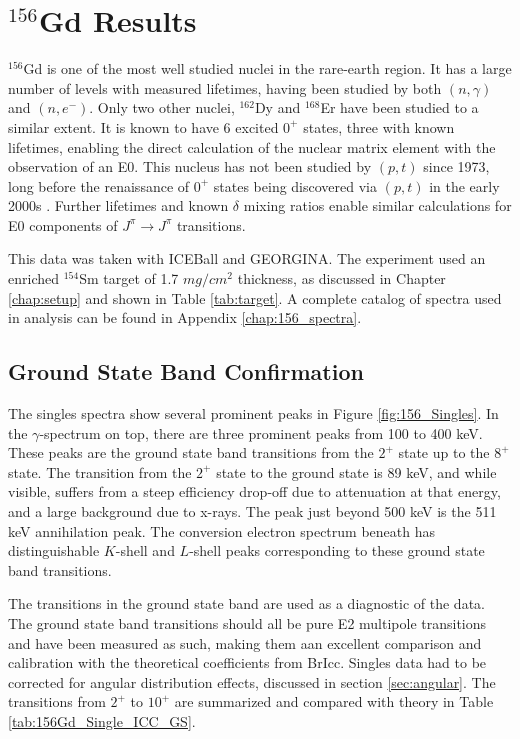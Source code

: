 \chapter{$^{156}$Gd Results}
\label{chap:156Gd}
\normalsize

$^{156}$Gd is one of the most well studied nuclei in the rare-earth region. It has a large number of levels with measured lifetimes, having been studied by both $(n,\gamma)$ and $(n,e^-)$\citep{klora93:_156gd}. Only two other nuclei, $^{162}$Dy and $^{168}$Er have been studied to a similar extent. It is known to have 6 excited $0^+$ states, three with known lifetimes, enabling the direct calculation of the nuclear matrix element with the observation of an E0. This nucleus has not been studied by $(p,t)$ since 1973, long before the renaissance of $0^+$ states being discovered via $(p,t)$ in the early 2000s \citep{fleming73:_156gd,lesher02:_158gd,meyer06:_zeroplus}. Further lifetimes and known $\delta$ mixing ratios enable similar calculations for E0 components of $J^{\pi}\rightarrow J^{\pi}$ transitions. 

This data was taken with ICEBall and GEORGINA. The experiment used an enriched $^{154}$Sm target of 1.7 $mg/cm^2$ thickness, as discussed in Chapter \ref{chap:setup} and shown in Table \ref{tab:target}. A complete catalog of spectra used in analysis can be found in Appendix \ref{chap:156_spectra}.

\section{Ground State Band Confirmation}

The singles spectra show several prominent peaks in Figure \ref{fig:156_Singles}. In the $\gamma$-spectrum on top, there are three prominent peaks from 100 to 400 keV. These peaks are the ground state band transitions from the $2^+$ state up to the $8^+$ state. The transition from the $2^+$ state to the ground state is 89 keV, and while visible, suffers from a steep efficiency drop-off due to attenuation at that energy, and a large background due to x-rays. The peak just beyond 500 keV is the 511 keV annihilation peak. The conversion electron spectrum beneath has distinguishable $K$-shell and $L$-shell peaks corresponding to these ground state band transitions. 

\afterpage{}

The transitions in the ground state band are used as a diagnostic of the data. The ground state band transitions should all be pure E2 multipole transitions and have been measured as such, making them aan excellent comparison and calibration with the theoretical coefficients from BrIcc\citep{kibedi08:_BRICC}. Singles data had to be corrected for angular distribution effects, discussed in section \ref{sec:angular}. The transitions from $2^+$ to $10^+$ are summarized and compared with theory in Table \ref{tab:156Gd_Single_ICC_GS}.

